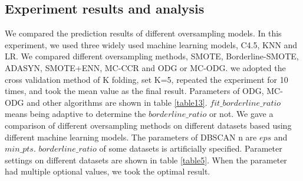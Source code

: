\documentclass[runningheads]{llncs}
\begin{document}
\subsection{Experiment results and analysis}
We compared the prediction results of different oversampling models.
In this experiment, we used three widely used machine learning models, C4.5, KNN and LR.
We compared different oversampling methods, SMOTE, Borderline-SMOTE, ADASYN, SMOTE+ENN, MC-CCR 
and ODG or MC-ODG.
we adopted the cross validation method of K folding, 
set K=5, repeated the experiment for 10 times, 
and took the mean value as the final result.
Parameters of ODG, MC-ODG and other algorithms are shown in table \ref{table13}.
$fit\_borderline\_ratio$ means being 
adaptive to determine the $borderline\_ratio$ or not.
We gave a comparison of different oversampling methods on different 
datasets based using different machine learning models.  
The parameters of DBSCAN n are $eps$ and $min\_pts$.
$borderline\_ratio$ of some datasets is artificially specified.
Parameter settings on different datasets are shown in table \ref{table5}.
When the parameter had multiple optional values, we took the optimal result.
\end{document}
